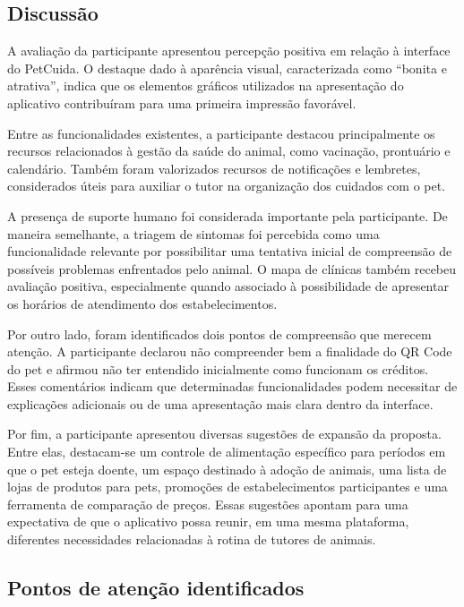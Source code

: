 \documentclass[12pt,a4paper]{article}
\begin{document}
\subsection{Discussão}

A avaliação da participante apresentou percepção positiva em relação à interface do
PetCuida. O destaque dado à aparência visual, caracterizada como \enquote{bonita e
atrativa}, indica que os elementos gráficos utilizados na apresentação do aplicativo
contribuíram para uma primeira impressão favorável.

Entre as funcionalidades existentes, a participante destacou principalmente os recursos
relacionados à gestão da saúde do animal, como vacinação, prontuário e calendário. Também
foram valorizados recursos de notificações e lembretes, considerados úteis para auxiliar
o tutor na organização dos cuidados com o pet.

A presença de suporte humano foi considerada importante pela participante. De maneira
semelhante, a triagem de sintomas foi percebida como uma funcionalidade relevante por
possibilitar uma tentativa inicial de compreensão de possíveis problemas enfrentados pelo
animal. O mapa de clínicas também recebeu avaliação positiva, especialmente quando
associado à possibilidade de apresentar os horários de atendimento dos estabelecimentos.

Por outro lado, foram identificados dois pontos de compreensão que merecem atenção. A
participante declarou não compreender bem a finalidade do QR Code do pet e afirmou não
ter entendido inicialmente como funcionam os créditos. Esses comentários indicam que
determinadas funcionalidades podem necessitar de explicações adicionais ou de uma
apresentação mais clara dentro da interface.

Por fim, a participante apresentou diversas sugestões de expansão da proposta. Entre elas,
destacam-se um controle de alimentação específico para períodos em que o pet esteja doente,
um espaço destinado à adoção de animais, uma lista de lojas de produtos para pets,
promoções de estabelecimentos participantes e uma ferramenta de comparação de preços.
Essas sugestões apontam para uma expectativa de que o aplicativo possa reunir, em uma
mesma plataforma, diferentes necessidades relacionadas à rotina de tutores de animais.

\subsection{Pontos de atenção identificados}
\end{document}
